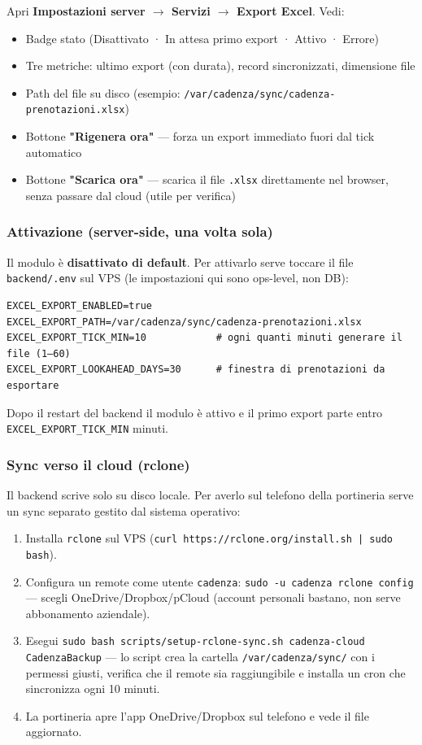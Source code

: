 \documentclass[11pt,a4paper]{article}
\begin{document}
Apri \textbf{Impostazioni server $\rightarrow$ Servizi $\rightarrow$ Export Excel}. Vedi:

\begin{itemize}
  \item Badge stato (Disattivato · In attesa primo export · Attivo · Errore)
  \item Tre metriche: ultimo export (con durata), record sincronizzati, dimensione file
  \item Path del file su disco (esempio: \texttt{/var/cadenza/sync/cadenza-prenotazioni.xlsx})
  \item Bottone \textbf{"Rigenera ora"} --- forza un export immediato fuori dal tick automatico
  \item Bottone \textbf{"Scarica ora"} --- scarica il file \texttt{.xlsx} direttamente nel browser, senza passare dal cloud (utile per verifica)
\end{itemize}

\subsubsection{Attivazione (server-side, una volta sola)}


Il modulo è \textbf{disattivato di default}. Per attivarlo serve toccare il file \texttt{backend/.env} sul VPS (le impostazioni qui sono ops-level, non DB):

\begin{lstlisting}
EXCEL_EXPORT_ENABLED=true
EXCEL_EXPORT_PATH=/var/cadenza/sync/cadenza-prenotazioni.xlsx
EXCEL_EXPORT_TICK_MIN=10            # ogni quanti minuti generare il file (1–60)
EXCEL_EXPORT_LOOKAHEAD_DAYS=30      # finestra di prenotazioni da esportare
\end{lstlisting}

Dopo il restart del backend il modulo è attivo e il primo export parte entro \texttt{EXCEL\_EXPORT\_TICK\_MIN} minuti.

\subsubsection{Sync verso il cloud (rclone)}


Il backend scrive solo su disco locale. Per averlo sul telefono della portineria serve un sync separato gestito dal sistema operativo:

\begin{enumerate}
  \item Installa \texttt{rclone} sul VPS (\texttt{curl https://rclone.org/install.sh | sudo bash}).
  \item Configura un remote come utente \texttt{cadenza}: \texttt{sudo -u cadenza rclone config} --- scegli OneDrive/Dropbox/pCloud (account personali bastano, non serve abbonamento aziendale).
  \item Esegui \texttt{sudo bash scripts/setup-rclone-sync.sh cadenza-cloud CadenzaBackup} --- lo script crea la cartella \texttt{/var/cadenza/sync/} con i permessi giusti, verifica che il remote sia raggiungibile e installa un cron che sincronizza ogni 10 minuti.
  \item La portineria apre l'app OneDrive/Dropbox sul telefono e vede il file aggiornato.
\end{enumerate}
\end{document}
